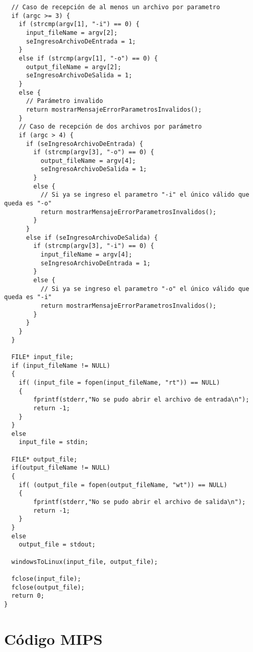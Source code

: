 \documentclass[a4paper,11pt]{article}
\begin{document}
\begin{verbatim}
  // Caso de recepción de al menos un archivo por parametro
  if (argc >= 3) {
    if (strcmp(argv[1], "-i") == 0) {
      input_fileName = argv[2];
      seIngresoArchivoDeEntrada = 1;
    }
    else if (strcmp(argv[1], "-o") == 0) {
      output_fileName = argv[2];
      seIngresoArchivoDeSalida = 1;
    }
    else {
      // Parámetro invalido
      return mostrarMensajeErrorParametrosInvalidos();
    }
    // Caso de recepción de dos archivos por parámetro
    if (argc > 4) {
      if (seIngresoArchivoDeEntrada) {
        if (strcmp(argv[3], "-o") == 0) {
          output_fileName = argv[4];
          seIngresoArchivoDeSalida = 1;
        }
        else {
          // Si ya se ingreso el parametro "-i" el único válido que queda es "-o"
          return mostrarMensajeErrorParametrosInvalidos();
        }
      }
      else if (seIngresoArchivoDeSalida) {
        if (strcmp(argv[3], "-i") == 0) {
          input_fileName = argv[4];
          seIngresoArchivoDeEntrada = 1;
        }
        else {
          // Si ya se ingreso el parametro "-o" el único válido que queda es "-i"
          return mostrarMensajeErrorParametrosInvalidos();
        }
      }
    }
  }

  FILE* input_file;
  if (input_fileName != NULL)
  {
    if( (input_file = fopen(input_fileName, "rt")) == NULL)
    {
        fprintf(stderr,"No se pudo abrir el archivo de entrada\n");
        return -1;
    }
  }
  else
    input_file = stdin;

  FILE* output_file;
  if(output_fileName != NULL)
  {
    if( (output_file = fopen(output_fileName, "wt")) == NULL)
    {
        fprintf(stderr,"No se pudo abrir el archivo de salida\n");
        return -1;
    }
  }
  else
    output_file = stdout;

  windowsToLinux(input_file, output_file);

  fclose(input_file);
  fclose(output_file);
  return 0;
}
\end{verbatim}


\section{C\'odigo MIPS}
\end{document}
